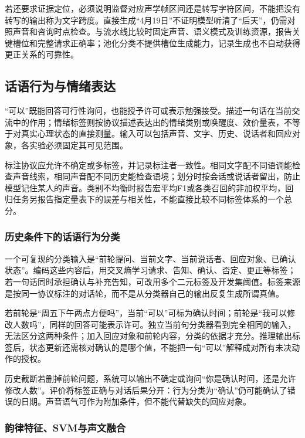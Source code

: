 若还要求证据定位，必须说明监督对应声学帧区间还是转写字符区间，不能把没有转写的输出称为文字跨度。直接生成“4月19日”不证明模型听清了“后天”，仍需对照声音和咨询时点检查。与流水线比较时固定声音、语义模式及训练资源，报告关键槽位和完整请求正确率；池化分类不提供槽位生成能力，记录生成也不自动获得更正关系的可靠性。

\subsection{话语行为与情绪表达}
\label{sec:nlp-speech-pragmatics}

“可以”既能回答可行性询问，也能授予许可或表示勉强接受。描述一句话在当前交流中的作用；情绪标签则按协议描述表达出的情绪类别或唤醒度、效价量表，不等于对真实心理状态的直接测量。输入可以包括声音、文字、历史、说话者和回应对象，各实验必须固定其可见范围。

标注协议应允许不确定或多标签，并记录标注者一致性。相同文字配不同语调能检查声音线索，相同声音配不同历史能检查语境；划分时按会话或说话者留出，防止模型记住某人的声音。类别不均衡时报告宏平均F1或各类召回的非加权平均，回归任务另报告指定量表下的误差与相关性，不能直接比较不同标签体系的一个总分。

\subsubsection{历史条件下的话语行为分类}
\label{sec:nlp-speech-dialogue-act}

一个可复现的分类输入是“前轮提问、当前文字、当前说话者、回应对象、已确认状态”。编码这些内容后，用交叉熵学习请求、告知、确认、否定、更正等标签；若一句话同时承担确认与补充告知，可改用多个二元标签及开发集阈值。标签来源是按同一协议标注的对话轮，而不是从分类器自己的输出反复生成所谓真值。

若前轮是“周五下午两点方便吗”，当前“可以”可标为确认时间；前轮是“我可以修改人数吗”，同样的回答可能表示许可。独立当前句分类器看到完全相同的输入，无法区分这两种条件；加入回应对象和前轮内容，分类的依据才充分。推理输出标签后，状态更新还需核对确认的是哪个值，不能把一句“可以”解释成对所有未决动作的授权。

历史截断若删掉前轮问题，系统可以输出不确定或询问“你是确认时间，还是允许修改人数”。评价将标签正确与对话后果分开：行为分类为“确认”仍可能确认了错误的日期。声音语气可作为附加条件，但不能代替缺失的回应对象。

\subsubsection{韵律特征、SVM与声文融合}
\label{sec:nlp-speech-prosody-classification}

